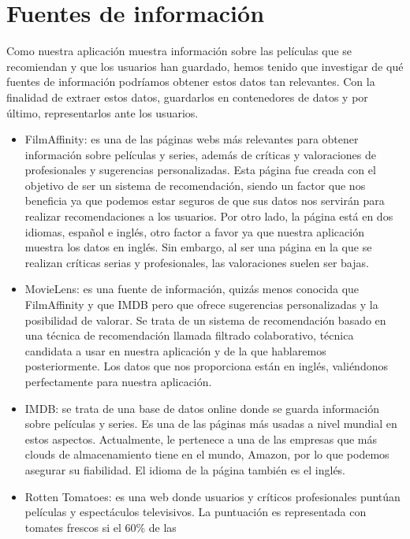 \section{Fuentes de información}
\label{makereference2.2}
Como nuestra aplicación muestra información sobre las películas que se recomiendan y que los usuarios han guardado, hemos
tenido que investigar de qué fuentes de información podríamos obtener estos datos tan relevantes. Con la finalidad de extraer
estos datos, guardarlos en contenedores de datos y por último, representarlos ante los usuarios.
\begin{itemize}
    \item FilmAffinity\cite{filmaffinity}: es una de las páginas webs más relevantes para obtener información sobre películas y series, además de críticas y valoraciones de profesionales y sugerencias personalizadas.
    Esta página fue creada con el objetivo de ser un sistema de recomendación, siendo un factor que nos beneficia ya que podemos estar seguros de que sus datos nos servirán para realizar recomendaciones a los usuarios.
    Por otro lado, la página está en dos idiomas, español e inglés, otro factor a favor ya que nuestra aplicación muestra los datos en inglés. Sin embargo, al ser una página en la 
    que se realizan críticas serias y profesionales, las valoraciones suelen ser bajas.
    \item MovieLens\cite{movielens}: es una fuente de información, quizás menos conocida que FilmAffinity y que IMDB pero que ofrece sugerencias personalizadas y la posibilidad de valorar. Se trata de un sistema de recomendación basado en una técnica de recomendación 
    llamada filtrado colaborativo\cite{filtradocolaborativo}, técnica candidata a usar en nuestra aplicación y de la que hablaremos posteriormente. Los datos que nos proporciona están en inglés, valiéndonos perfectamente para nuestra aplicación.
    \item IMDB\cite{imdb}: se trata de una base de datos online donde se guarda información sobre películas y series. Es una de las páginas más usadas a nivel mundial en estos aspectos.
    Actualmente, le pertenece a una de las empresas que más clouds de almacenamiento tiene en el mundo, Amazon, por lo que podemos asegurar su fiabilidad. El idioma de la página también es el inglés.
    \item Rotten Tomatoes\cite{rottentomatoes}: es una web donde usuarios y
     críticos profesionales puntúan películas y espectáculos televisivos.
    La puntuación es representada con tomates frescos si el 60\% de las

\end{itemize}
